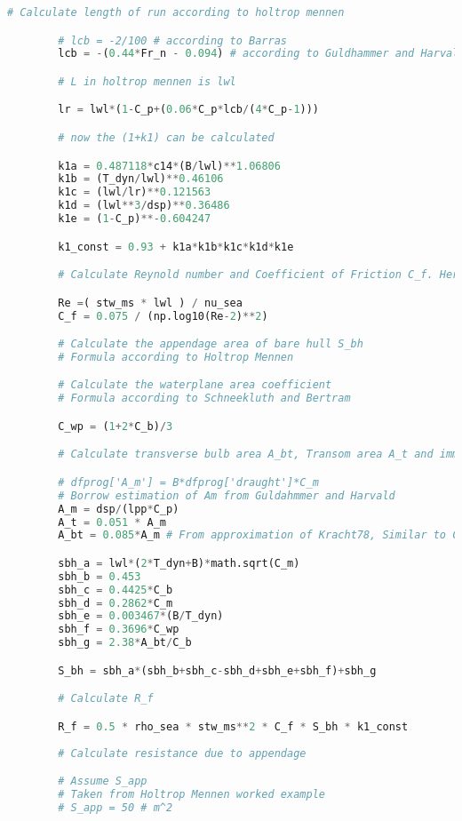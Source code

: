 \begin{lstlisting}[language=Python]
        # Calculate length of run according to holtrop mennen

        # lcb = -2/100 # according to Barras
        lcb = -(0.44*Fr_n - 0.094) # according to Guldhammer and Harvald

        # L in holtrop mennen is lwl

        lr = lwl*(1-C_p+(0.06*C_p*lcb/(4*C_p-1)))

        # now the (1+k1) can be calculated

        k1a = 0.487118*c14*(B/lwl)**1.06806
        k1b = (T_dyn/lwl)**0.46106
        k1c = (lwl/lr)**0.121563
        k1d = (lwl**3/dsp)**0.36486
        k1e = (1-C_p)**-0.604247

        k1_const = 0.93 + k1a*k1b*k1c*k1d*k1e

        # Calculate Reynold number and Coefficient of Friction C_f. Here, the C_f will be dynamic and depend on the velocity of the ship

        Re =( stw_ms * lwl ) / nu_sea
        C_f = 0.075 / (np.log10(Re-2)**2)

        # Calculate the appendage area of bare hull S_bh
        # Formula according to Holtrop Mennen

        # Calculate the waterplane area coefficient 
        # Formula according to Schneekluth and Bertram

        C_wp = (1+2*C_b)/3

        # Calculate transverse bulb area A_bt, Transom area A_t and immersed midship section area A_m according to Kim 2019

        # dfprog['A_m'] = B*dfprog['draught']*C_m
        # Borrow estimation of Am from Guldahmmer and Harvald
        A_m = dsp/(lpp*C_p)
        A_t = 0.051 * A_m
        A_bt = 0.085*A_m # From approximation of Kracht78, Similar to Charcalis

        sbh_a = lwl*(2*T_dyn+B)*math.sqrt(C_m)
        sbh_b = 0.453
        sbh_c = 0.4425*C_b
        sbh_d = 0.2862*C_m
        sbh_e = 0.003467*(B/T_dyn)
        sbh_f = 0.3696*C_wp
        sbh_g = 2.38*A_bt/C_b

        S_bh = sbh_a*(sbh_b+sbh_c-sbh_d+sbh_e+sbh_f)+sbh_g

        # Calculate R_f

        R_f = 0.5 * rho_sea * stw_ms**2 * C_f * S_bh * k1_const
 
        # Calculate resistance due to appendage

        # Assume S_app
        # Taken from Holtrop Mennen worked example
        # S_app = 50 # m^2 


\end{lstlisting}
